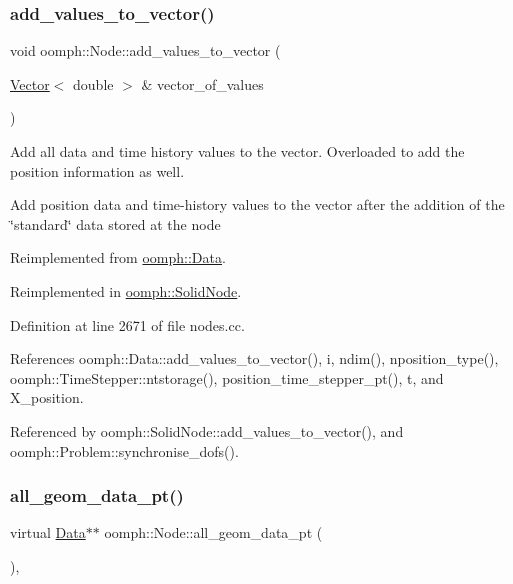 \subsubsection{\texorpdfstring{add\+\_\+values\+\_\+to\+\_\+vector()}{add\_values\_to\_vector()}}
{\footnotesize\ttfamily void oomph\+::\+Node\+::add\+\_\+values\+\_\+to\+\_\+vector (\begin{DoxyParamCaption}\item[{\hyperlink{classoomph_1_1Vector}{Vector}$<$ double $>$ \&}]{vector\+\_\+of\+\_\+values }\end{DoxyParamCaption})\hspace{0.3cm}{\ttfamily [virtual]}}



Add all data and time history values to the vector. Overloaded to add the position information as well. 

Add position data and time-\/history values to the vector after the addition of the \char`\"{}standard\char`\"{} data stored at the node 

Reimplemented from \hyperlink{classoomph_1_1Data_a6c40a2fbaf44f976d71d9768e1c9ccfa}{oomph\+::\+Data}.



Reimplemented in \hyperlink{classoomph_1_1SolidNode_a20562ea5133c1150b6999a73badb63e8}{oomph\+::\+Solid\+Node}.



Definition at line 2671 of file nodes.\+cc.



References oomph\+::\+Data\+::add\+\_\+values\+\_\+to\+\_\+vector(), i, ndim(), nposition\+\_\+type(), oomph\+::\+Time\+Stepper\+::ntstorage(), position\+\_\+time\+\_\+stepper\+\_\+pt(), t, and X\+\_\+position.



Referenced by oomph\+::\+Solid\+Node\+::add\+\_\+values\+\_\+to\+\_\+vector(), and oomph\+::\+Problem\+::synchronise\+\_\+dofs().

\mbox{\label{classoomph_1_1Node_a76d3081bdc3407744e6d8631a613d780}} 
\subsubsection{\texorpdfstring{all\+\_\+geom\+\_\+data\+\_\+pt()}{all\_geom\_data\_pt()}}
{\footnotesize\ttfamily virtual \hyperlink{classoomph_1_1Data}{Data}$\ast$$\ast$ oomph\+::\+Node\+::all\+\_\+geom\+\_\+data\+\_\+pt (\begin{DoxyParamCaption}{ }\end{DoxyParamCaption})\hspace{0.3cm}{\ttfamily [inline]}, {\ttfamily [virtual]}}



